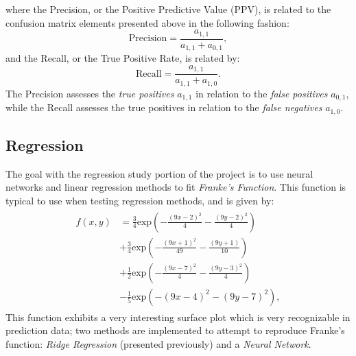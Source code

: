             where the Precision, or the Positive Predictive Value (PPV), is related to the confusion matrix elements presented above in the following fashion:
            \begin{equation}
                \text{Precision} = \frac{a_{1,1}}{a_{1,1}+a_{0,1}},
            \end{equation}
            and the Recall, or the True Positive Rate, is related by:
            \begin{equation}
                \text{Recall} = \frac{a_{1,1}}{a_{1,1}+a_{1,0}}.
            \end{equation}
            The Precision assesses the \textit{true positives} $a_{1,1}$ in relation to the \textit{false positives} $a_{0,1}$, while the Recall assesses the true positives in relation to the \textit{false negatives} $a_{1,0}$\cite{2}.
            
    \subsection{Regression}
        The goal with the regression study portion of the project is to use neural networks and linear regression methods to fit \textit{Franke's Function}. This function is typical to use when testing regression methods, and is given by:
        \begin{align}\label{eq:frankes_function}
            \begin{split}
                f(x, y) &= \frac{3}{4}\text{exp}\left(-\frac{(9x - 2)^2}{4} - \frac{(9y - 2)^2}{4}\right) \\
                &+ \frac{3}{4}\text{exp}\left(-\frac{(9x + 1)^2}{49} - \frac{(9y + 1)}{10}\right) \\
                &+ \frac{1}{2}\text{exp}\left(-\frac{(9x - 7)^2}{4} - \frac{(9y - 3)^2}{4}\right) \\
                &- \frac{1}{5}\text{exp}\left(-(9x - 4)^2 - (9y - 7)^2\right),
            \end{split}
        \end{align}
        This function exhibits a very interesting surface plot which is very recognizable in prediction data; two methods are implemented to attempt to reproduce Franke's function: \textit{Ridge Regression} (presented previously) and a \textit{Neural Network}.
